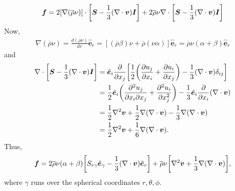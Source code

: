 \documentclass[12pt]{article} %
\newcommand{\pderiv}[2]{\frac{\partial#1}{\partial#2}}
\newcommand{\e}{\hat{\bm{e}}}
\newcommand{\rhobar}{\overline{\rho}}
\newcommand{\Div}{\nabla\cdot}
\begin{document}
	\begin{align*}
	\bm{f} = 2[\nabla(\rhobar\nu)]\cdot\bigg{[}\bm{S}-\frac{1}{3}(\Div\bm{v})\bm{I}\bigg{]} + 2\rhobar\nu\Div\bigg{[}\bm{S}-\frac{1}{3}(\Div\bm{v})\bm{I}\bigg{]}
	\end{align*}
	Now,
	\begin{align*}
	\nabla(\rhobar\nu) = \frac{d(\rhobar\nu)}{dr}\e_r = [(\rhobar\beta)\nu + \rhobar(\nu\alpha)]\e_r = \rhobar\nu(\alpha+\beta)\e_r
	\end{align*}
	and
	\begin{align*}
	\Div\bigg{[}\bm{S}-\frac{1}{3}(\Div\bm{v})\bm{I}\bigg{]} &= \e_i\pderiv{}{x_j}\bigg{[}\frac{1}{2}\bigg{(}\pderiv{u_j}{x_i}+\pderiv{u_i}{x_j}\bigg{)} - \frac{1}{3}(\Div\bm{v})\delta_{ij}\bigg{]}\\
	&= \frac{1}{2}\e_i\bigg{(}\frac{\partial^2u_j}{\partial x_i\partial x_j} + \frac{\partial^2u_i}{\partial x_j^2}\bigg{)}-\frac{1}{3}\e_i\pderiv{}{x_i}(\Div\bm{v})\\
	&= \frac{1}{2}\nabla^2\bm{v} + \frac{1}{2} \nabla(\Div\bm{v}) - \frac{1}{3}\nabla(\Div\bm{v})\\
	&= \frac{1}{2}\nabla^2\bm{v} + \frac{1}{6} \nabla(\Div\bm{v}).
	\end{align*}
	Thus,
	\begin{align}
	\bm{f} = 2\rhobar\nu(\alpha+\beta)\bigg{[}S_{r\gamma}\e_\gamma - \frac{1}{3}(\Div\bm{v})\e_r\bigg{]} + \rhobar\nu\bigg{[}\nabla^2\bm{v}+\frac{1}{3}\nabla(\Div\bm{v})\bigg{]},
	\label{eq:f_vectorform}
	\end{align}
	where $\gamma$ runs over the spherical coordinates $r,\theta,\phi$. 
	
\end{document}
